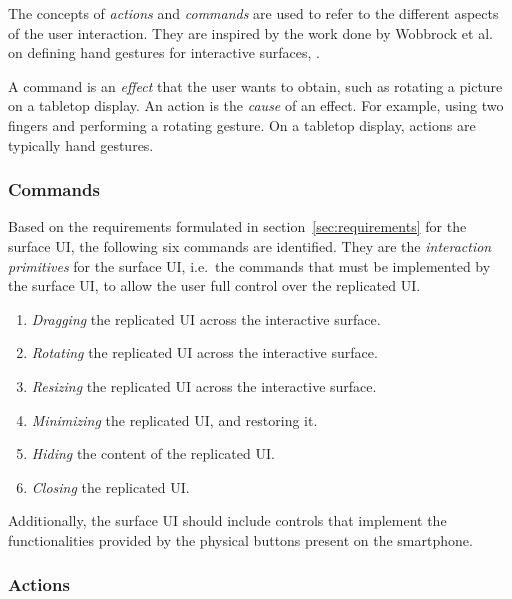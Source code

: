 The concepts of \emph{actions} and \emph{commands} are used to refer to the different aspects of the user interaction.
They are inspired by the work done by Wobbrock et al. on defining hand gestures for interactive surfaces, \citep{Wobbrock:2009:gestures}.

A command is an \emph{effect} that the user wants to obtain, such as rotating a picture on a tabletop display.
An action is the \emph{cause} of an effect.
For example, using two fingers and performing a rotating gesture.
On a tabletop display, actions are typically hand gestures.


\subsubsection{Commands}

Based on the requirements formulated in section~\ref{sec:requirements} for the surface UI, the following six commands are identified.
They are the \emph{interaction primitives} for the surface UI, i.e.\ the commands that must be implemented by the surface UI, to allow the user full control over the replicated UI.

\begin{enumerate}
\item{\emph{Dragging} the replicated UI across the interactive surface.}
\item{\emph{Rotating} the replicated UI across the interactive surface.}
\item{\emph{Resizing} the replicated UI across the interactive surface.}
\item{\emph{Minimizing} the replicated UI, and restoring it.}
\item{\emph{Hiding} the content of the replicated UI.}
\item{\emph{Closing} the replicated UI.}
\end{enumerate}

Additionally, the surface UI should include controls that implement the functionalities provided by the physical buttons present on the smartphone.

\subsubsection{Actions}

